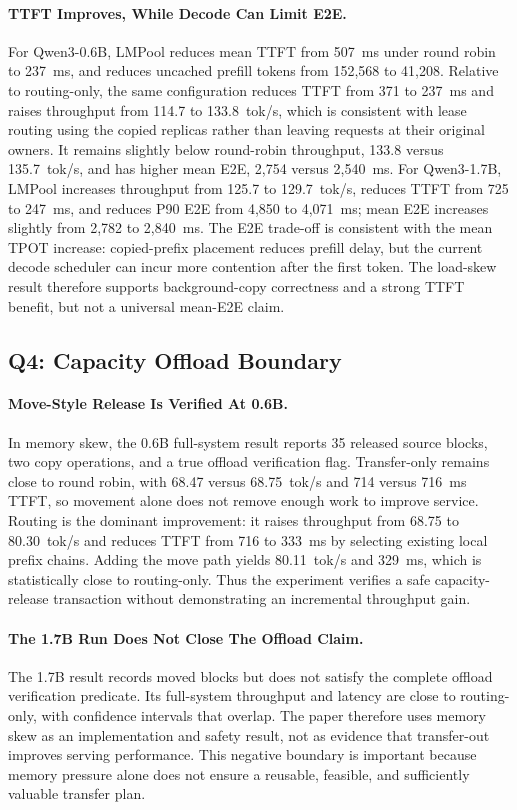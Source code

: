 \documentclass{article}
\newcommand{\sys}{LMPool}
\begin{document}
\paragraph{TTFT Improves, While Decode Can Limit E2E.} For Qwen3-0.6B, \sys{} reduces mean TTFT from 507~ms under round robin to 237~ms, and reduces uncached prefill tokens from 152,568 to 41,208. Relative to routing-only, the same configuration reduces TTFT from 371 to 237~ms and raises throughput from 114.7 to 133.8~tok/s, which is consistent with lease routing using the copied replicas rather than leaving requests at their original owners. It remains slightly below round-robin throughput, 133.8 versus 135.7~tok/s, and has higher mean E2E, 2,754 versus 2,540~ms. For Qwen3-1.7B, \sys{} increases throughput from 125.7 to 129.7~tok/s, reduces TTFT from 725 to 247~ms, and reduces P90 E2E from 4,850 to 4,071~ms; mean E2E increases slightly from 2,782 to 2,840~ms. The E2E trade-off is consistent with the mean TPOT increase: copied-prefix placement reduces prefill delay, but the current decode scheduler can incur more contention after the first token. The load-skew result therefore supports background-copy correctness and a strong TTFT benefit, but not a universal mean-E2E claim.

\subsection{Q4: Capacity Offload Boundary}

\paragraph{Move-Style Release Is Verified At 0.6B.} In memory skew, the 0.6B full-system result reports 35 released source blocks, two copy operations, and a true offload verification flag. Transfer-only remains close to round robin, with 68.47 versus 68.75~tok/s and 714 versus 716~ms TTFT, so movement alone does not remove enough work to improve service. Routing is the dominant improvement: it raises throughput from 68.75 to 80.30~tok/s and reduces TTFT from 716 to 333~ms by selecting existing local prefix chains. Adding the move path yields 80.11~tok/s and 329~ms, which is statistically close to routing-only. Thus the experiment verifies a safe capacity-release transaction without demonstrating an incremental throughput gain.

\paragraph{The 1.7B Run Does Not Close The Offload Claim.} The 1.7B result records moved blocks but does not satisfy the complete offload verification predicate. Its full-system throughput and latency are close to routing-only, with confidence intervals that overlap. The paper therefore uses memory skew as an implementation and safety result, not as evidence that transfer-out improves serving performance. This negative boundary is important because memory pressure alone does not ensure a reusable, feasible, and sufficiently valuable transfer plan.
\end{document}

